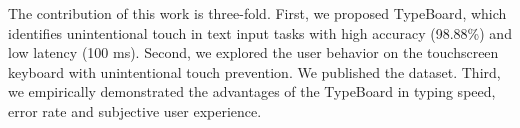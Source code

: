 The contribution of this work is three-fold. First, we proposed TypeBoard, which identifies unintentional touch in text input tasks with high accuracy (98.88\%) and low latency (100 ms). Second, we explored the user behavior on the touchscreen keyboard with unintentional touch prevention. We published the dataset. Third, we empirically demonstrated the advantages of the TypeBoard in typing speed, error rate and subjective user experience.
